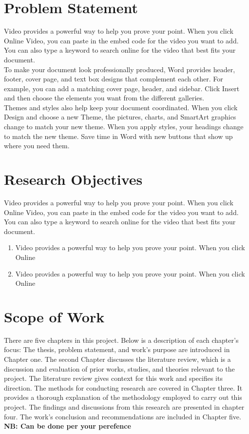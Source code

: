 \documentclass[12pt,a4paper]{report}
\begin{document}
\section{Problem Statement}
Video provides a powerful way to help you prove your point. When you click Online Video, you can paste in the embed code for the video you want to add. You can also type a keyword to search online for the video that best fits your document.\\
To make your document look professionally produced, Word provides header, footer, cover page, and text box designs that complement each other. For example, you can add a matching cover page, header, and sidebar. Click Insert and then choose the elements you want from the different galleries.\\
Themes and styles also help keep your document coordinated. When you click Design and choose a new Theme, the pictures, charts, and SmartArt graphics change to match your new theme. When you apply styles, your headings change to match the new theme.
Save time in Word with new buttons that show up where you need them.\\


\section{Research Objectives}
Video provides a powerful way to help you prove your point. When you click Online Video, you can paste in the embed code for the video you want to add. You can also type a keyword to search online for the video that best fits your document.\\

\begin{enumerate}
    \item 
    Video provides a powerful way to help you prove your point. When you click Online 
    \item
    Video provides a powerful way to help you prove your point. When you click Online 
\end{enumerate}

\section{Scope of Work}
There are five chapters in this project. Below is a description of each chapter's focus:
The thesis, problem statement, and work's purpose are introduced in Chapter one. The second Chapter discusses the literature review, which is a discussion and evaluation of prior works, studies, and theories relevant to the project. The literature review gives context for this work and specifies its direction. The methods for conducting research are covered in Chapter three. It provides a thorough explanation of the methodology employed to carry out this project. The findings and discussions from this research are presented in chapter four. The work's conclusion and recommendations are included in Chapter five.
\textbf{NB: Can be done per your perefence}
\end{document}
